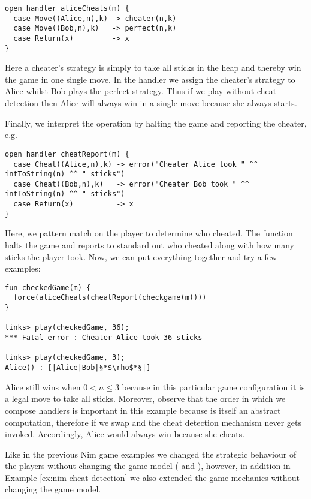 \begin{example}
\begin{lstlisting}[style=links]
open handler aliceCheats(m) {
  case Move((Alice,n),k) -> cheater(n,k)
  case Move((Bob,n),k)   -> perfect(n,k)
  case Return(x)         -> x
}
\end{lstlisting}
Here a cheater's strategy is simply to take all sticks in the heap and thereby win the game in one single move. In the handler  we assign the cheater's strategy to Alice whilst Bob plays the perfect strategy. Thus if we play without cheat detection then Alice will always win in a single move because she always starts.

Finally, we interpret the  operation by halting the game and reporting the cheater, e.g.
\begin{lstlisting}[style=links]
open handler cheatReport(m) {
  case Cheat((Alice,n),k) -> error("Cheater Alice took " ^^ intToString(n) ^^ " sticks")
  case Cheat((Bob,n),k)   -> error("Cheater Bob took " ^^ intToString(n) ^^ " sticks")
  case Return(x)          -> x
}
\end{lstlisting}
Here, we pattern match on the player to determine who cheated. The  function halts the game and reports to standard out who cheated along with how many sticks the player took. Now, we can put everything together and try a few examples:
\begin{lstlisting}[style=links]
fun checkedGame(m) {
  force(aliceCheats(cheatReport(checkgame(m))))
}

links> play(checkedGame, 36);
*** Fatal error : Cheater Alice took 36 sticks

links> play(checkedGame, 3);
Alice() : [|Alice|Bob|§*$\rho$*§|]
\end{lstlisting}
Alice still wins when $0 < n \leq 3$ because in this particular game configuration it is a legal move to take all sticks.
Moreover, observe that the order in which we compose handlers is important in this example because  is itself an abstract computation, therefore if we swap  and  the cheat detection mechanism never gets invoked. Accordingly, Alice would always win because she cheats.
\end{example}
Like in the previous Nim game examples we changed the strategic behaviour of the players without changing the game model ( and ), however, in addition in Example \ref{ex:nim-cheat-detection} we also extended the game mechanics without changing the game model.

